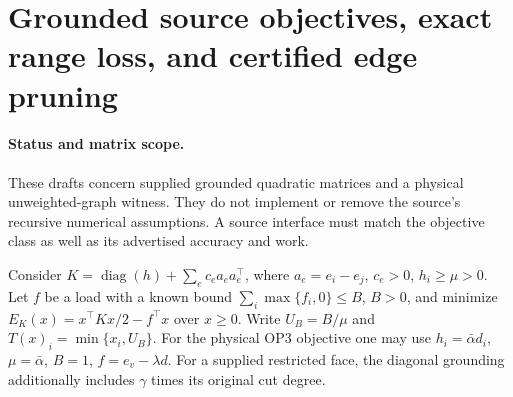 \section[Grounding, range and pruning]{Grounded source objectives, exact range loss, and certified edge pruning}
\label{sec:op3-grounded-source-interface}

\paragraph{Status and matrix scope.}
These \statusproved{} drafts concern supplied grounded quadratic matrices
and a physical unweighted-graph witness. They do not implement or remove
the source's recursive numerical assumptions. A source interface must match
the objective class as well as its advertised accuracy and work.

Consider $K=\operatorname{diag}(h)+\sum_e c_e a_ea_e^\top$, where
$a_e=e_i-e_j$, $c_e>0$, $h_i\geq\mu>0$. Let $f$ be a load with a known
bound $\sum_i\max\{f_i,0\}\leq B$, $B>0$, and minimize
$E_K(x)=x^\top Kx/2-f^\top x$ over $x\geq0$.
Write $U_B=B/\mu$ and $T(x)_i=\min\{x_i,U_B\}$.
For the physical OP3 objective one may use $h_i=\bar\alpha d_i$,
$\mu=\bar\alpha$, $B=1$, $f=e_v-\lambda d$.
For a supplied restricted face, the diagonal grounding additionally
includes $\gamma$ times its original cut degree.

